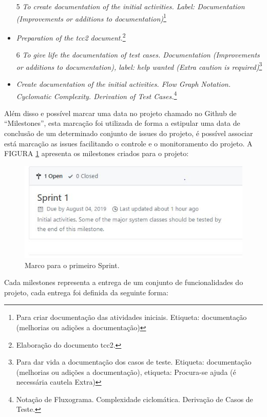 \begin{itemize}
 \item[5] \textit{To create documentation of the initial activities. Label: Documentation (Improvements or additions to documentation)}\footnote{
Para criar documentação das atividades iniciais. Etiqueta: documentação (melhorias ou adições a documentação)}

\item \textit{Preparation of the tcc2 document.}\footnote{Elaboração do documento tcc2.}

 \item[6] \textit{To give life the documentation of test cases. Documentation (Improvements or additions to documentation), label: help wanted (Extra caution is required)}\footnote{Para dar vida a documentação dos casos de teste. Etiqueta: documentação (melhorias ou adições a documentação), etiqueta: Procura-se ajuda (é necessária cautela Extra)}
 
\item \textit{Create documentation of the initial activities. Flow Graph Notation. Cyclomatic Complexity. Derivation of Test Cases.}\footnote{Notação de Fluxograma. Complexidade ciclomática. Derivação de Casos de Teste.}

\end{itemize}{}




Além disso e possível marcar uma data no projeto chamado no Github de “Milestones”, esta marcação foi utilizada de forma a estipular uma data de conclusão de um determinado conjunto de issues do projeto, é possível associar está marcação as issues facilitando o controle e o monitoramento do projeto. A FIGURA \ref{splint1} apresenta os milestones criados para o projeto: 
\begin{figure}[H]
	\centering
	\includegraphics[scale=1.1]{dados/figuras/milestones.JPG}
	\caption{Marco para o primeiro Sprint.}
	\label{splint1}
\end{figure}

Cada milestones representa a entrega de um conjunto de funcionalidades do projeto, cada entrega foi definida da seguinte forma:

